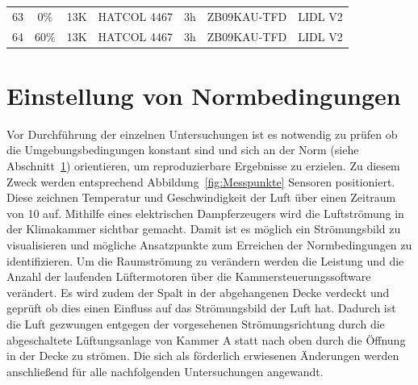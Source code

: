 \begin{table}[h!]
\begin{tabular}{|ccccccc|}
\multicolumn{1}{|c|}{63} & \multicolumn{1}{c|}{0\%}  & \multicolumn{1}{c|}{13K} & \multicolumn{1}{c|}{HATCOL 4467} & \multicolumn{1}{c|}{3h} & \multicolumn{1}{c|}{ZB09KAU-TFD}     & LIDL V2    \\
\multicolumn{1}{|c|}{64} & \multicolumn{1}{c|}{60\%} & \multicolumn{1}{c|}{13K} & \multicolumn{1}{c|}{HATCOL 4467} & \multicolumn{1}{c|}{3h} & \multicolumn{1}{c|}{ZB09KAU-TFD}     & LIDL V2    \\ \hline
\end{tabular}
\end{table}



\section{Einstellung von Normbedingungen}
\label{sec:Einstellung von Normbedingungen}

Vor Durchführung der einzelnen Untersuchungen ist es notwendig zu prüfen ob die Umgebungsbedingungen konstant sind und sich an der Norm (siehe Abschnitt~\ref{sec:Einstellung von Normbedingungen}) orientieren, um reproduzierbare Ergebnisse zu erzielen. Zu diesem Zweck werden entsprechend Abbildung~\ref{fig:Messpunkte} Sensoren positioniert. Diese zeichnen Temperatur und Geschwindigkeit der Luft über einen Zeitraum von \unit{10}{\min} auf. Mithilfe eines elektrischen Dampferzeugers wird die Luftströmung in der Klimakammer sichtbar gemacht. Damit ist es möglich ein Strömungsbild zu visualisieren und mögliche Ansatzpunkte zum Erreichen der Normbedingungen zu identifizieren. Um die Raumströmung zu verändern werden die Leistung und die Anzahl der laufenden Lüftermotoren über die Kammersteuerungssoftware verändert. Es wird zudem der Spalt in der abgehangenen Decke verdeckt und geprüft ob dies einen Einfluss auf das Strömungsbild der Luft hat. Dadurch ist die Luft gezwungen entgegen der vorgesehenen Strömungsrichtung durch die abgeschaltete Lüftungsanlage von Kammer A statt nach oben durch die Öffnung in der Decke zu strömen.  Die sich als förderlich erwiesenen Änderungen werden anschließend für alle nachfolgenden Untersuchungen angewandt.

